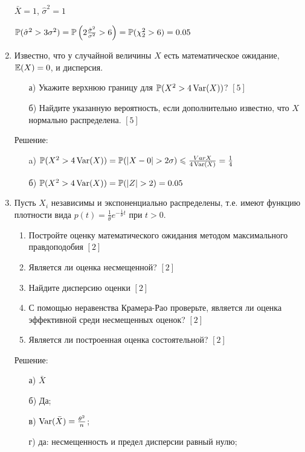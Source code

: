 \documentclass[12pt, a4paper]{article}\usepackage[]{graphicx}\usepackage[]{color}
\begin{document}
\begin{enumerate}
$\bar{X}=1$, $\hat{\sigma}^{2}=1$

$\P(\hat{\sigma}^{2}>3\sigma^{2})=\P\left(2\frac{\hat{\sigma}^{2}}{\sigma^{2}}>6\right)=\P(\chi_{2}^{2}>6)=0.05$

\item Известно, что у случайной величины $X$ есть
математическое
ожидание, $\E(X)=0$, и дисперсия.
\begin{enumerate}
\item[а)] Укажите верхнюю границу для $\P(X^{2}>4\Var(X))$? $[5]$
\item[б)] Найдите указанную вероятность, если дополнительно известно, что
$X$ нормально распределена. $[5]$
\end{enumerate}
Решение:
\begin{enumerate}
\item[a)] $\P(X^{2}>4\Var(X))=\P(|X-0|>2\sigma)\le
\frac{Var{X}}{4\Var(X)}=\frac{1}{4}$
\item[б)] $\P(X^{2}>4\Var(X))=\P(|Z|>2)=0.05$
\end{enumerate}

\item Пусть $X_{i}$ независимы и экспоненциально
распределены, т.е. имеют функцию плотности вида
$p(t)=\frac{1}{\theta}e^{-\frac{1}{\theta}t}$ при $t>0$.
\begin{enumerate}
\item Постройте оценку математического ожидания методом максимального
правдоподобия $[2]$
\item Является ли оценка несмещенной? $[2]$
\item Найдите дисперсию оценки $[2]$
\item С помощью неравенства Крамера-Рао проверьте, является ли
оценка эффективной среди несмещенных оценок? $[2]$
\item Является ли построенная оценка состоятельной? $[2]$
\end{enumerate}
Решение:
\begin{enumerate}
\item[а)] $\bar{X}$
\item[б)] Да;
\item[в)] $\Var(\bar{X})=\frac{\theta^{2}}{n}$;
\item[г)] да: несмещенность и предел дисперсии равный нулю;
\end{enumerate}


\end{enumerate}
\end{document}
